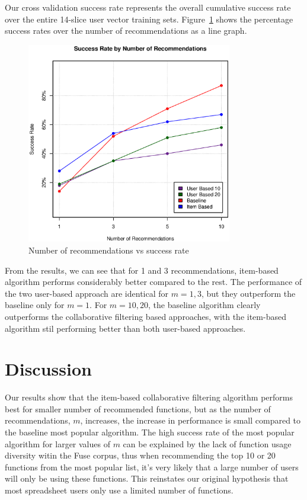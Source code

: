 \documentclass{article} %
\begin{document}
Our cross validation success rate represents the overall cumulative success rate over the entire 14-slice user vector training sets. Figure~\ref{fig:results} shows the percentage success rates over the number of recommendations as a line graph.

\begin{figure}[h]
\begin{center}
\includegraphics[width=0.8\textwidth]{graph}
\end{center}
\caption{Number of recommendations vs success rate}
\label{fig:results}
\end{figure}

From the results, we can see that for 1 and 3 recommendations, item-based algorithm performs considerably better compared to the rest. The performance of the two user-based approach are identical for $m=1,3$, but they outperform the baseline only for $m=1$. For $m=10,20$, the baseline algorithm clearly outperforms the collaborative filtering based approaches, with the item-based algorithm stil performing better than both user-based approaches.

\section{Discussion}
Our results show that the item-based collaborative filtering algorithm performs best for smaller number of recommended functions, but as the number of recommendations, $m$, increases, the increase in performance is small compared to the baseline most popular algorithm. The high success rate of the most popular algorithm for larger values of $m$ can be explained by the lack of function usage diversity witin the Fuse corpus, thus when recommending the top 10 or 20 functions from the most popular list, it's very likely that a large number of users will only be using these functions. This reinstates our original hypothesis that most spreadsheet users only use a limited number of functions.
\end{document}
